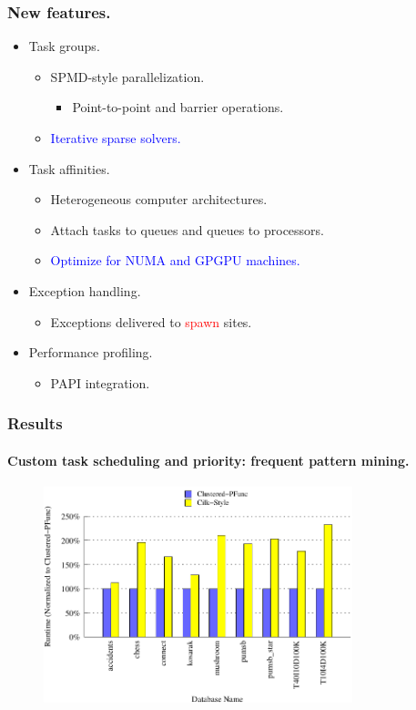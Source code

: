 \documentclass{beamer}
\begin{document}
\begin{frame}
\frametitle{New features.}
\begin{itemize}
\item Task groups.
  \begin{itemize}
  \item SPMD-style parallelization.
    \begin{itemize}
    \item Point-to-point and barrier operations.
    \end{itemize}
  \item \textcolor{blue}{Iterative sparse solvers.}
  \end{itemize}
\item Task affinities.
  \begin{itemize}
  \item Heterogeneous computer architectures.
  \item Attach tasks to queues and queues to processors.
  \item \textcolor{blue}{Optimize for NUMA and GPGPU machines.}
  \end{itemize}
\item Exception handling.
  \begin{itemize}
  \item Exceptions delivered to \textcolor{red}{spawn} sites.
  \end{itemize}
\item Performance profiling.
  \begin{itemize}
  \item PAPI integration.
  \end{itemize}
\end{itemize}
\end{frame}

\begin{frame}[fragile]
\frametitle{Results}
\framesubtitle{Custom task scheduling and priority: frequent pattern mining.}
\begin{figure}
\includegraphics[width=0.8\textwidth]{figs/fim_8}
\label{fig:fim}
\end{figure}
\end{frame}
\end{document}

